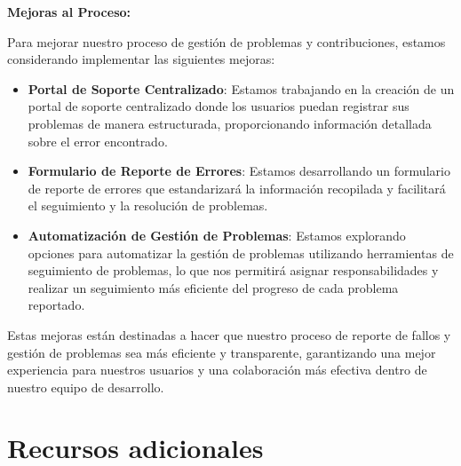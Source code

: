 \documentclass{article}
\begin{document}
    \textbf{Mejoras al Proceso:}
    
    Para mejorar nuestro proceso de gestión de problemas y contribuciones, estamos considerando implementar las siguientes mejoras:
    
    \begin{itemize}
        \item \textbf{Portal de Soporte Centralizado}: Estamos trabajando en la creación de un portal de soporte centralizado donde los usuarios puedan registrar sus problemas de manera estructurada, proporcionando información detallada sobre el error encontrado.
        
        \item \textbf{Formulario de Reporte de Errores}: Estamos desarrollando un formulario de reporte de errores que estandarizará la información recopilada y facilitará el seguimiento y la resolución de problemas.
        
        \item \textbf{Automatización de Gestión de Problemas}: Estamos explorando opciones para automatizar la gestión de problemas utilizando herramientas de seguimiento de problemas, lo que nos permitirá asignar responsabilidades y realizar un seguimiento más eficiente del progreso de cada problema reportado.
    \end{itemize}
    
    Estas mejoras están destinadas a hacer que nuestro proceso de reporte de fallos y gestión de problemas sea más eficiente y transparente, garantizando una mejor experiencia para nuestros usuarios y una colaboración más efectiva dentro de nuestro equipo de desarrollo.

\section{Recursos adicionales}
\end{document}

